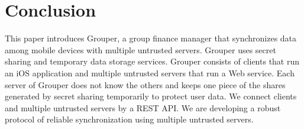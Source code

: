 \documentclass[twocolumn,10pt]{article}
\begin{document}
\section{Conclusion}

This paper introduces Grouper, a group finance manager that synchronizes data among mobile devices with multiple untrusted servers. Grouper uses secret sharing and temporary data storage services. Grouper consists of clients that run an iOS application and multiple untrusted servers that run a Web service. Each server of Grouper does not know the others and keeps one piece of the shares generated by secret sharing temporarily to protect user data. We connect clients and multiple untrusted servers by a REST API. We are developing a robust protocol of reliable synchronization using multiple untrusted servers.


{
	\footnotesize
	
}
\end{document}
